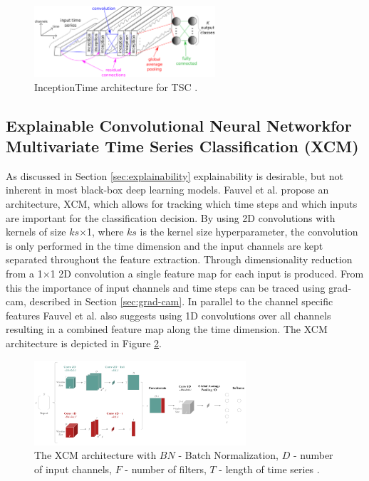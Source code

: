 \begin{figure}
  \centering
  \includegraphics[width=0.6\textwidth]{files/figs/inceptiontime.png}
  \caption{InceptionTime architecture for TSC \cite{IsmailFawaz2020}.}
  \label{fig:inceptiontime}
\end{figure}

\subsection{Explainable Convolutional Neural Networkfor Multivariate Time Series Classification (XCM)}
As discussed in Section \ref{sec:explainability} explainability is desirable, but not inherent in most black-box deep learning models. Fauvel et al. \cite{Fauvel2020} propose an architecture, XCM, which allows for tracking which time steps and which inputs are important for the classification decision. By using 2D convolutions with kernels of size $ks$$\times$1, where $ks$ is the kernel size hyperparameter, the convolution is only performed in the time dimension and the input channels are kept separated throughout the feature extraction. Through dimensionality reduction from a 1$\times$1 2D convolution a single feature map for each input is produced. From this the importance of input channels and time steps can be traced using \gls{grad-cam}, described in Section \ref{sec:grad-cam}. In parallel to the channel specific features Fauvel et al. also suggests using 1D convolutions over all channels resulting in a combined feature map along the time dimension. The XCM architecture is depicted in Figure \ref{fig:xcm}.

\begin{figure}
  \centering
  \includegraphics[width=0.7\textwidth]{files/figs/xcm.png}
  \caption{The XCM architecture with $BN$ - Batch Normalization, $D$ - number of input channels, $F$ - number of filters, $T$ - length of time series \cite{Fauvel2020}.}
  \label{fig:xcm}
\end{figure}
